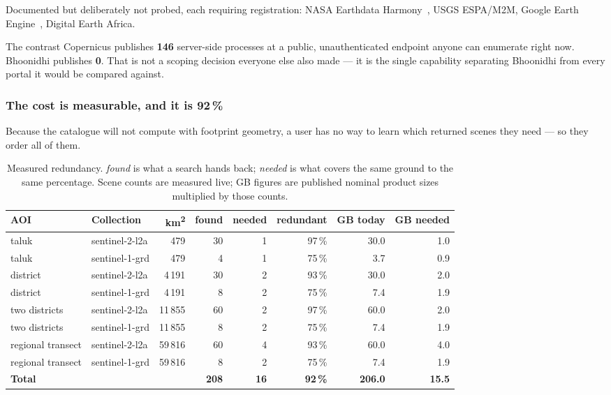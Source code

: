 Documented but deliberately not probed, each requiring registration: NASA
Earthdata Harmony~\cite{harmony}, USGS ESPA/M2M, Google Earth
Engine~\cite{gee}, Digital Earth Africa.

\begin{keyfinding}{The contrast}
Copernicus publishes \textbf{146} server-side processes at a public,
unauthenticated endpoint anyone can enumerate right now. Bhoonidhi publishes
\textbf{0}. That is not a scoping decision everyone else also made --- it is the
single capability separating Bhoonidhi from every portal it would be compared
against.
\end{keyfinding}

\subsubsection{The cost is measurable, and it is 92\,\%}
\label{sec:cost}

Because the catalogue will not compute with footprint geometry, a user has no
way to learn which returned scenes they need --- so they order all of them.

\begin{table}[htbp]
\centering\small
\caption{Measured redundancy. \emph{found} is what a search hands back;
\emph{needed} is what covers the same ground to the same percentage. Scene
counts are measured live; GB figures are published nominal product sizes
multiplied by those counts.}
\label{tab:redundancy}
\footnotesize
\begin{tabular}{@{}llrrrrrr@{}}
\toprule
\textbf{AOI} & \textbf{Collection} & \textbf{km\textsuperscript{2}} &
\textbf{found} & \textbf{needed} & \textbf{redundant} &
\textbf{GB today} & \textbf{GB needed} \\
\midrule
taluk             & sentinel-2-l2a &    479 & 30 & 1 & 97\,\% & 30.0 & 1.0 \\
taluk             & sentinel-1-grd &    479 &  4 & 1 & 75\,\% &  3.7 & 0.9 \\
district          & sentinel-2-l2a &  4\,191 & 30 & 2 & 93\,\% & 30.0 & 2.0 \\
district          & sentinel-1-grd &  4\,191 &  8 & 2 & 75\,\% &  7.4 & 1.9 \\
two districts     & sentinel-2-l2a & 11\,855 & 60 & 2 & 97\,\% & 60.0 & 2.0 \\
two districts     & sentinel-1-grd & 11\,855 &  8 & 2 & 75\,\% &  7.4 & 1.9 \\
regional transect & sentinel-2-l2a & 59\,816 & 60 & 4 & 93\,\% & 60.0 & 4.0 \\
regional transect & sentinel-1-grd & 59\,816 &  8 & 2 & 75\,\% &  7.4 & 1.9 \\
\midrule
\textbf{Total} & & & \textbf{208} & \textbf{16} & \textbf{92\,\%} &
\textbf{206.0} & \textbf{15.5} \\
\bottomrule
\end{tabular}
\end{table}

